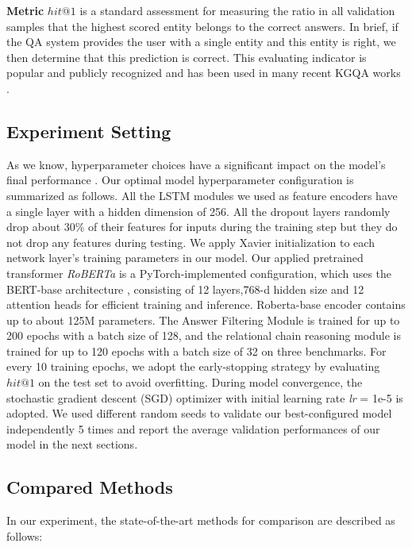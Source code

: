 \documentclass[pdflatex,sn-mathphys]{sn-jnl}%
\theoremstyle{thmstyleone}%
\theoremstyle{thmstyletwo}%
\theoremstyle{thmstylethree}%
\begin{document}
\textbf{Metric} $hit@1$ is a standard assessment for measuring the ratio in all validation samples that the highest scored entity belongs to the correct answers. In brief, if the QA system provides the user with a single entity and this entity is right, we then determine that this prediction is correct. This evaluating indicator is popular and publicly recognized and has been used in many recent KGQA works \cite{apoorv2020embedKGQA,chen2019uhopKGQA,yunshi2020graphKGQA}.


\subsection{Experiment Setting}
As we know, hyperparameter choices have a significant impact on the model's final performance \cite{electronics3zuojwq,cvtassd1zuojwq,zzm2022ijannconfere}. Our optimal model hyperparameter configuration is summarized as follows. All the LSTM modules we used as feature encoders have a single layer with a hidden dimension of 256. All the dropout layers randomly drop about 30\% of their features for inputs during the training step but they do not drop any features during testing. We apply Xavier initialization to each network layer's training parameters in our model.
Our applied pretrained transformer \textit{RoBERTa} is a PyTorch-implemented configuration, which uses the BERT-base architecture \cite{tqx1zuoenhancere,ghj2022KSEMconfere,google2018bert}, consisting of 12 layers,768-d hidden size and 12 attention heads for efficient training and inference. Roberta-base encoder \cite{ott2019fairseq,roberta} contains up to about 125M parameters. The Answer Filtering Module is trained for up to 200 epochs with a batch size of 128, and the relational chain reasoning module is trained for up to 120 epochs with a batch size of 32 on three benchmarks. For every 10 training epochs, we adopt the early-stopping strategy by evaluating $hit@1$ on the test set to avoid overfitting. During model convergence, the stochastic gradient descent (SGD) optimizer with initial learning rate \textit{lr} = 1e-5 is adopted. We used different random seeds to validate our best-configured model independently 5 times and report the average validation performances of our model in the next sections.

\subsection{Compared Methods}
In our experiment, the state-of-the-art methods for comparison are described as follows:
\end{document}
